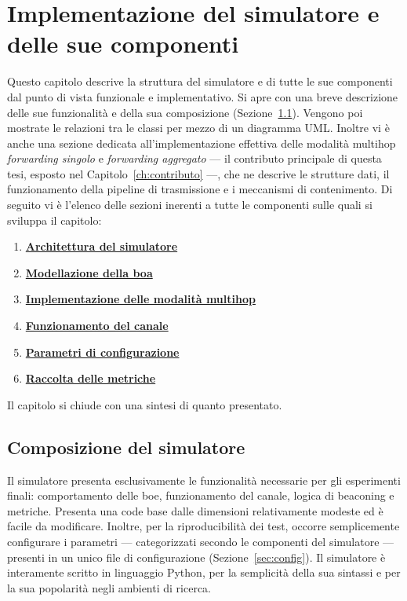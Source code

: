 \chapter{Implementazione del simulatore e delle sue componenti}
\label{ch:simulatore}
Questo capitolo descrive la struttura del simulatore e di tutte le sue componenti
dal punto di vista funzionale e implementativo.
Si apre con una breve descrizione delle sue funzionalit\`a e della sua composizione (Sezione~\ref{sec:composizione}). 
Vengono poi mostrate le relazioni tra le classi per mezzo di un
diagramma UML. Inoltre vi \`e anche una sezione dedicata all'implementazione effettiva delle 
modalit\`a multihop \emph{forwarding singolo} e \emph{forwarding aggregato} --- il contributo principale di questa tesi, esposto nel
Capitolo~\ref{ch:contributo} ---, che ne descrive le strutture dati, il funzionamento della pipeline di trasmissione
e i meccanismi di contenimento.
Di seguito vi \`e l'elenco delle sezioni inerenti a tutte le componenti sulle quali si sviluppa il capitolo:
\begin{enumerate}[leftmargin=1.4em]
 \item \hyperref[sec:simulatore]{\textbf{Architettura del simulatore}}
 \item \hyperref[sec:buoy]{\textbf{Modellazione della boa}}
 \item \hyperref[sec:multihop-impl]{\textbf{Implementazione delle modalit\`a multihop}}
 \item \hyperref[sec:channel]{\textbf{Funzionamento del canale}}
 \item \hyperref[sec:config]{\textbf{Parametri di configurazione}}
 \item \hyperref[sec:metrics]{\textbf{Raccolta delle metriche}}
\end{enumerate}
Il capitolo si chiude con una sintesi di quanto presentato.

\section{Composizione del simulatore}
\label{sec:composizione}
Il simulatore presenta esclusivamente le funzionalit\`a necessarie per gli esperimenti finali: 
comportamento delle boe, funzionamento del canale, logica di beaconing e metriche. 
Presenta una code base dalle dimensioni relativamente modeste ed \`e facile da modificare.
Inoltre, per la riproducibilit\`a dei test, occorre semplicemente configurare i parametri
--- categorizzati secondo le componenti del simulatore --- presenti in un unico file di
configurazione (Sezione~\ref{sec:config}). Il simulatore \`e interamente scritto in linguaggio Python,
per la semplicit\`a della sua sintassi e per la sua popolarit\`a negli ambienti di ricerca.

